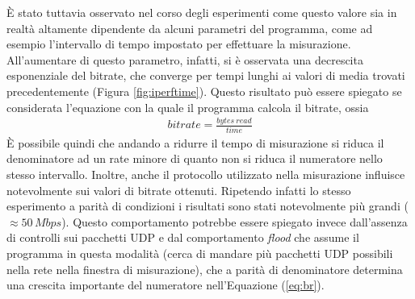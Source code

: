 \documentclass[a4paper,10pt]{article}
\begin{document}
\noindent
È stato tuttavia osservato nel corso degli esperimenti come questo valore sia in realtà altamente dipendente da alcuni parametri del programma, come ad esempio l'intervallo di tempo impostato per effettuare la misurazione. All'aumentare di questo parametro, infatti, si è osservata una decrescita esponenziale del bitrate, che converge per tempi lunghi ai valori di media trovati precedentemente (Figura \ref{fig:iperftime}). Questo risultato può essere spiegato se considerata l'equazione con la quale il programma calcola il bitrate, ossia
\begin{align}
\label{eq:br}
bitrate = \frac{bytes \ read}{time}
\end{align}
È possibile quindi che andando a ridurre il tempo di misurazione si riduca il denominatore ad un rate minore di quanto non si riduca il numeratore nello stesso intervallo. Inoltre, anche il protocollo utilizzato nella misurazione influisce notevolmente sui valori di bitrate ottenuti. Ripetendo infatti lo stesso esperimento a parità di condizioni i risultati sono stati notevolmente più grandi ($\approx 50\,Mbps$). Questo comportamento potrebbe essere spiegato invece dall'assenza di controlli sui pacchetti UDP e dal comportamento \textit{flood} che assume il programma in questa modalità (cerca di mandare più pacchetti UDP possibili nella rete nella finestra di misurazione), che a parità di denominatore determina una crescita importante del numeratore nell'Equazione (\ref{eq:br}).
\end{document}
